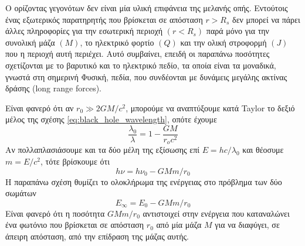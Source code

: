 Ο ορίζοντας γεγονότων δεν είναι μία υλική επιφάνεια της μελανής οπής. Εντούτοις ένας εξωτερικός παρατηρητής που βρίσκεται σε απόσταση $r > R_s$ δεν μπορεί να πάρει άλλες πληροφορίες για την εσωτερική περιοχή $(r < R_s)$ παρά μόνο για την συνολική μάζα $(M)$, το ηλεκτρικό φορτίο $(Q)$ και την ολική στροφορμή $(J)$ που η περιοχή αυτή περιέχει. Αυτό συμβαίνει, επειδή οι παραπάνω ποσότητες σχετίζονται με το βαρυτικό και το ηλεκτρικό πεδίο, τα οποία είναι τα μοναδικά, γνωστά στη σημερινή Φυσική, πεδία, που συνδέονται με δυνάμεις μεγάλης ακτίνας δράσης (long range forces). 

Είναι φανερό ότι αν $r_0 \gg 2GM/c^2$, μπορούμε να αναπτύξουμε κατά Taylor το δεξιό μέλος της σχέσης \eqref{eq:black_hole_wavelength}, οπότε έχουμε
\begin{equation}
	\frac{\lambda_0}{\lambda} = 1 - \frac{GM}{r_o c^2}
\end{equation}
Αν πολλαπλασιάσουμε και τα δύο μέλη της εξίσωσης επί $E = hc/\lambda_0$ και θέοσυμε $m=E/c^2$, τότε βρίσκουμε ότι
\begin{equation*}
	h\nu = h\nu_0 - GMm/r_0
\end{equation*}
Η παραπάνω σχέση θυμίζει το ολοκλήρωμα της ενέργειας στο πρόβλημα των δύο σωμάτων
\begin{equation*}
	E_{\infty} = E_0 - GMm/r_0
\end{equation*}
Είναι φανερό ότι η ποσότητα $GMm/r_0$ αντιστοιχεί στην ενέργεια που καταναλώνει ένα φωτόνιο που βρίσκεται σε απόσταση $r_0$ από μία μάζα $M$ για να διαφύγει, σε άπειρη απόσταση, από την επίδραση της μάζας αυτής.


